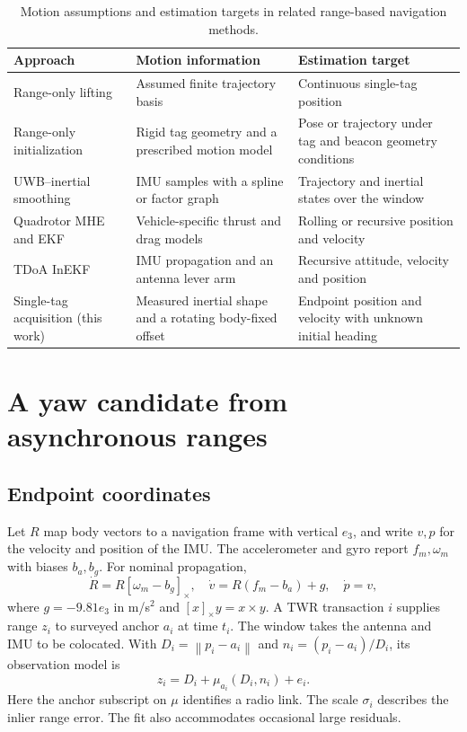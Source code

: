 \documentclass{IEEEtaes}
\newcommand{\norm}[1]{\left\lVert#1\right\rVert}
\newcommand{\sk}[1]{[#1]_\times}
\begin{document}
\begin{table}[t]
\centering\caption{Motion assumptions and estimation targets in related range-based navigation methods.}
\label{tab:landscape}\tablefont
\begin{tabular*}{\textwidth}{@{\extracolsep{\fill}}>{\raggedright\arraybackslash}p{}>{\raggedright\arraybackslash}p{}>{\raggedright\arraybackslash}p{}@{}}
\toprule
Approach&Motion information&Estimation target\\\midrule
Range-only lifting~\cite{pacholska}&Assumed finite trajectory basis&Continuous single-tag position\\
Range-only initialization~\cite{goudar}&Rigid tag geometry and a prescribed motion model&Pose or trajectory under tag and beacon geometry conditions\\
UWB--inertial smoothing~\cite{sfuise,jiang}&IMU samples with a spline or factor graph&Trajectory and inertial states over the window\\
Quadrotor MHE and EKF~\cite{pfeiffer,pfeiffer25}&Vehicle-specific thrust and drag models&Rolling or recursive position and velocity\\
TDoA InEKF~\cite{oursland}&IMU propagation and an antenna lever arm&Recursive attitude, velocity and position\\
Single-tag acquisition (this work)&Measured inertial shape and a rotating body-fixed offset&Endpoint position and velocity with unknown initial heading\\
\bottomrule
\end{tabular*}
\end{table}

\section{A yaw candidate from asynchronous ranges}\label{sec:profile}
\subsection{Endpoint coordinates}
Let \(R\) map body vectors to a navigation frame with vertical \(e_3\), and write \(v,p\) for the velocity and position of the IMU. The accelerometer and gyro report \(f_m,\omega_m\) with biases \(b_a,b_g\). For nominal propagation,
\begin{equation}
 \dot R=R\sk{\omega_m-b_g},\quad
 \dot v=R(f_m-b_a)+g,\quad \dot p=v ,
 \label{eq:ins}
\end{equation}
where \(g=-9.81e_3\) in m/s\(^2\) and \(\sk{x}y=x\times y\). A TWR transaction \(i\) supplies range \(z_i\) to surveyed anchor \(a_i\) at time \(t_i\). The window takes the antenna and IMU to be colocated. With \(D_i=\norm{p_i-a_i}\) and \(n_i=(p_i-a_i)/D_i\), its observation model is
\begin{equation}
 z_i=D_i+\mu_{a_i}(D_i,n_i)+e_i . \label{eq:observation}
\end{equation}
Here the anchor subscript on \(\mu\) identifies a radio link. The scale \(\sigma_i\) describes the inlier range error. The fit also accommodates occasional large residuals.
\end{document}

